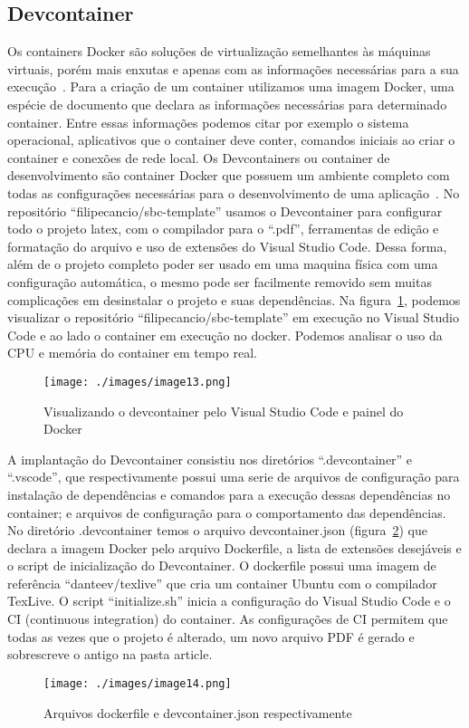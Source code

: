 

\subsection{Devcontainer}
Os containers Docker são soluções de virtualização semelhantes às máquinas virtuais, porém mais enxutas e apenas com as informações necessárias para a sua execução~\cite{vitalino:01}. Para a criação de um container utilizamos uma imagem Docker, uma espécie de documento que declara as informações necessárias para determinado container. Entre essas informações podemos citar por exemplo o sistema operacional, aplicativos que o container deve conter, comandos iniciais ao criar o container e conexões de rede local.
Os Devcontainers ou container de desenvolvimento são container Docker que possuem um ambiente completo com todas as configurações necessárias para o desenvolvimento de uma aplicação~\cite{github:01}. No repositório ``filipecancio/sbc-template'' usamos o Devcontainer para configurar todo o projeto latex, com o compilador para o ``.pdf'', ferramentas de edição e formatação do arquivo e uso de extensões do Visual Studio Code. Dessa forma, além de o projeto completo poder ser usado em uma maquina física com uma configuração automática, o mesmo pode ser facilmente removido sem muitas complicações em desinstalar o projeto e suas dependências.
Na figura~\ref{fig:image13}, podemos visualizar o repositório ``filipecancio/sbc-template'' em execução no Visual Studio Code e ao lado o container em execução no docker. Podemos analisar o uso da CPU e memória do container em tempo real.

\begin{figure}[ht]
	\centering
	\texttt{[image: ./images/image13.png]}
	\caption{Visualizando o devcontainer pelo Visual Studio Code e painel do Docker}
	\label{fig:image13}
\end{figure}

A implantação do Devcontainer consistiu nos diretórios ``.devcontainer'' e ``.vscode'', que respectivamente possui uma serie de arquivos de configuração para instalação de dependências e comandos para a execução dessas dependências no container; e arquivos de configuração para o comportamento das dependências.
No diretório .devcontainer temos o arquivo devcontainer.json (figura~\ref{fig:image14}) que declara a imagem Docker pelo arquivo Dockerfile, a lista de extensões desejáveis e o script de inicialização do Devcontainer. O dockerfile possui uma imagem de referência ``danteev/texlive'' que cria um container Ubuntu com o compilador TexLive. O script ``initialize.sh'' inicia a configuração do Visual Studio Code e o CI (continuous integration) do container. As configurações de CI permitem que todas as vezes que o projeto é alterado, um novo arquivo PDF é gerado e sobrescreve o antigo na pasta article.

\begin{figure}[ht]
	\centering
	\texttt{[image: ./images/image14.png]}
	\caption{Arquivos dockerfile e devcontainer.json respectivamente}
	\label{fig:image14}
\end{figure}


